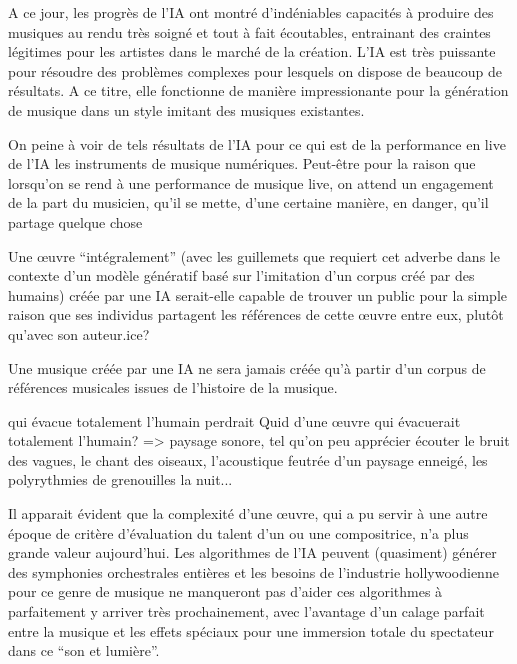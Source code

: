 A ce jour, les progrès de l'IA ont montré d'indéniables capacités à produire des musiques au rendu très soigné et tout à fait écoutables, entrainant des craintes légitimes pour les artistes dans le marché de la création. 
L'IA est très puissante pour résoudre des problèmes complexes pour lesquels on dispose de beaucoup de résultats. A ce titre, elle fonctionne de manière impressionante pour la génération de musique dans un style imitant des musiques existantes.

On peine à voir de tels résultats de l'IA pour ce qui est de la performance en live de l'IA les instruments de musique numériques.
Peut-être pour la raison que lorsqu'on se rend à une performance de musique live, on attend un engagement de la part du musicien, qu'il se mette, d'une certaine manière, en danger, qu'il partage quelque chose



Une œuvre ``intégralement'' (avec les guillemets que requiert cet adverbe dans le contexte d'un modèle génératif basé sur l'imitation d'un corpus créé par des humains) créée par une IA serait-elle capable de trouver un public pour la simple raison que ses individus partagent les références de cette œuvre entre eux, plutôt qu'avec son auteur.ice?

Une musique créée par une IA ne sera jamais créée qu'à partir d'un corpus de références musicales issues de l'histoire de la musique.

qui évacue totalement l'humain perdrait 
Quid d'une œuvre qui évacuerait totalement l'humain?
=> paysage sonore, tel qu'on peu apprécier écouter le bruit des vagues, le chant des oiseaux, l'acoustique feutrée d'un paysage enneigé, les polyrythmies de grenouilles la nuit...


Il apparait évident que la complexité d'une œuvre, qui a pu servir à une autre époque de critère d'évaluation du talent d'un ou une compositrice, n'a plus grande valeur aujourd'hui. Les algorithmes de l'IA peuvent (quasiment) générer des symphonies orchestrales entières et les besoins de l'industrie hollywoodienne pour ce genre de musique ne manqueront pas d'aider ces algorithmes à parfaitement y arriver très prochainement, avec l'avantage d'un calage parfait entre la musique et les effets spéciaux pour une immersion totale du spectateur dans ce ``son et lumière''.

